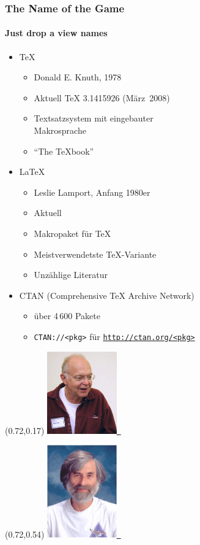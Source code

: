 \documentclass[t,ngerman]{beamer}
\begin{document}
\begin{frame}
  \frametitle{The Name of the Game}
  \framesubtitle{Just drop a view names}
  \begin{itemize}
  \item \TeX
    \begin{itemize}
    \item Donald E. Knuth, 1978
    \item Aktuell \TeX{} 3.1415926 (März~2008)
    \item Textsatzsystem mit eingebauter\\
      Makrosprache
    \item \enquote{The \TeX{}book}
    \end{itemize}
  \item \LaTeX
    \begin{itemize}
    \item Leslie Lamport, Anfang 1980er
    \item Aktuell 
    \item Makropaket für \TeX
    \item Meistverwendetste \TeX-Variante
    \item Unzählige Literatur
    \end{itemize}
  \item CTAN (Comprehensive \TeX{} Archive Network)
    \begin{itemize}
    \item über 4\,600 Pakete
    \item \texttt{CTAN://<pkg>} für \href{http://ctan.org}{\texttt{http://ctan.org/<pkg>}}
    \end{itemize}
  \end{itemize}
  \begin{textblock}{3}(0.72,0.17)
    \href{https://en.wikipedia.org/wiki/File:KnuthAtOpenContentAlliance.jpg}{%
      \includegraphics[width=3cm]{don-knuth}~%
    }
  \end{textblock}
  \begin{textblock}{3}(0.72,0.54)
    \href{https://en.wikipedia.org/wiki/File:Leslie_Lamport.jpg}{%
      \includegraphics[width=3cm]{leslie-lamport}~%
    }
  \end{textblock}
\end{frame}
\end{document}
